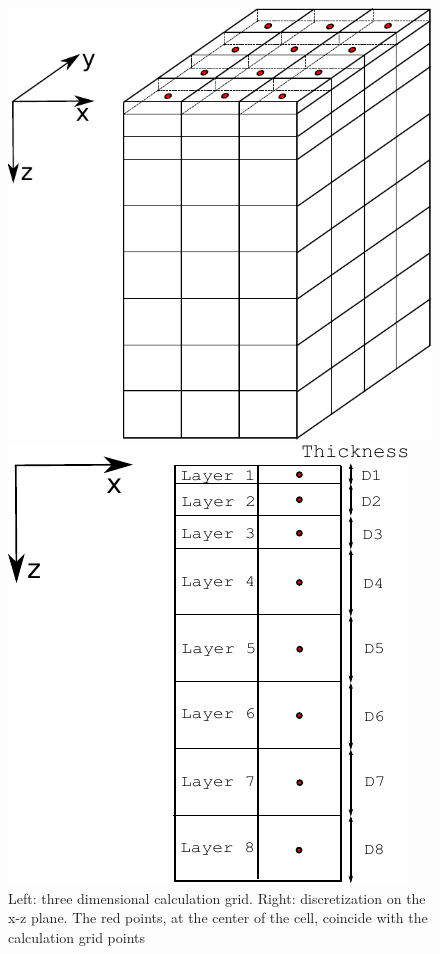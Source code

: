 \begin{figure}[!h]
\begin{center}
\begin{minipage}[c]{0.46 \textwidth}
\centering
\includegraphics[width =0.9 \textwidth]{./images/pic_domain/discre_3d_nospess}
\end{minipage}%
\hspace{10mm}%
\begin{minipage}[c]{0.46 \textwidth}
\centering
\includegraphics[width =0.9 \textwidth]{./images/pic_domain/soil_verticale.pdf}
\end{minipage}%
\end{center}
\caption{Left: three dimensional calculation grid. Right: discretization on the x-z plane. The red points, at the center of the cell, coincide with the calculation grid points}
\label{Fig_discr3d}
\end{figure}

